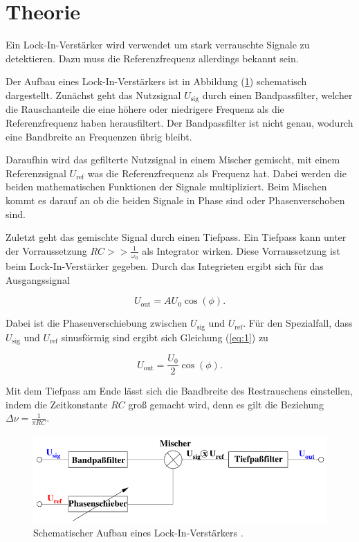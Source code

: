\section{Theorie}

Ein Lock-In-Verstärker wird verwendet um stark verrauschte Signale zu detektieren.
Dazu muss die Referenzfrequenz allerdings bekannt sein.

Der Aufbau eines Lock-In-Verstärkers ist in Abbildung (\ref{abb:1}) schematisch
dargestellt. Zunächst geht das Nutzsignal $U_\text{sig}$ durch einen Bandpassfilter,
welcher die Rauschanteile die eine höhere oder niedrigere Frequenz als die
Referenzfrequenz haben herausfiltert. Der Bandpassfilter ist nicht genau, wodurch
eine Bandbreite an Frequenzen übrig bleibt.

Daraufhin wird das gefilterte Nutzsignal in einem Mischer gemischt, mit einem
Referenzsignal $U_\text{ref}$ was die Referenzfrequenz als Frequenz hat. Dabei werden
die beiden mathematischen Funktionen der Signale multipliziert. Beim Mischen kommt
es darauf an ob die beiden Signale in Phase sind oder Phasenverschoben sind.

Zuletzt geht das gemischte Signal durch einen Tiefpass. Ein Tiefpass kann unter der
Vorraussetzung $RC >> \frac{1}{\omega_0}$ als Integrator wirken. Diese Vorraussetzung ist
beim Lock-In-Verstärker gegeben. Durch das Integrieten ergibt sich für das Ausgangssignal

\begin{equation}
  U_{\text{out}} = A U_0 \cos(\phi).
  \label{eq:1}
\end{equation}

Dabei ist \phi die Phasenverschiebung zwischen $U_\text{sig}$ und $U_\text{ref}$. Für den
Spezialfall, dass $U_\text{sig}$ und $U_\text{ref}$ sinusförmig sind ergibt sich Gleichung
(\ref{eq:1}) zu

\begin{equation*}
  U_{\text{out}} =  \frac{U_0}{2} \cos(\phi).
\end{equation*}

Mit dem Tiefpass am Ende lässt sich die Bandbreite des Restrauschens einstellen, indem
die Zeitkonstante $RC$ groß gemacht wird, denn es gilt die Beziehung $\Delta \nu = \frac{1}{\pi RC}$.

\begin{figure}[H]
  \centering
  \includegraphics[width=\textwidth]{Skizze.png}
  \caption{Schematischer Aufbau eines Lock-In-Verstärkers \cite{1}.}
  \label{abb:1}
\end{figure}
